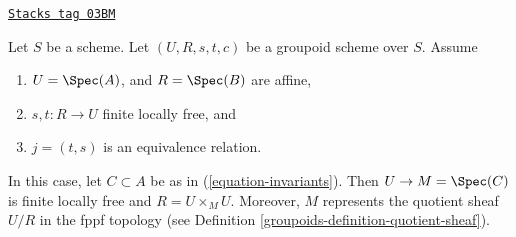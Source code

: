 \begin{proposition}
\label{groupoids-proposition-finite-flat-equivalence}
\href{https://stacks.math.columbia.edu/tag/03BM}{\texttt{Stacks tag 03BM}}

Let $S$ be a scheme.
Let $(U, R, s, t, c)$ be a groupoid scheme over $S$.
Assume
\begin{enumerate}
\item $U = \Spec(A)$, and $R = \Spec(B)$ are affine,
\item $s, t : R \to U$ finite locally free, and
\item $j = (t, s)$ is an equivalence relation.
\end{enumerate}
In this case, let $C \subset A$ be as in
(\ref{equation-invariants}). Then $U \to M = \Spec(C)$
is finite locally free and $R = U \times_M U$.
Moreover, $M$ represents the quotient sheaf $U/R$
in the fppf topology (see Definition \ref{groupoids-definition-quotient-sheaf}).
\end{proposition}

